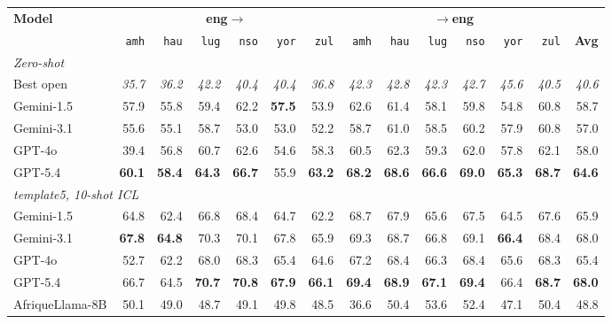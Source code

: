 \begin{table}[t]
\centering
\small
\renewcommand{\arraystretch}{1.05}
\begin{tabular}{lrrrrrrrrrrrrr}
\toprule
\textbf{Model} & \multicolumn{6}{c}{\textbf{eng$\to$}} & \multicolumn{6}{c}{\textbf{$\to$eng}} & \\
\cmidrule(lr){2-7}\cmidrule(lr){8-13}
   & \texttt{amh} & \texttt{hau} & \texttt{lug} & \texttt{nso} & \texttt{yor} & \texttt{zul} & \texttt{amh} & \texttt{hau} & \texttt{lug} & \texttt{nso} & \texttt{yor} & \texttt{zul} & \textbf{Avg} \\
\midrule
\multicolumn{14}{l}{\textit{Zero-shot}} \\
\midrule
Best open & \emph{35.7} & \emph{36.2} & \emph{42.2} & \emph{40.4} & \emph{40.4} & \emph{36.8} & \emph{42.3} & \emph{42.8} & \emph{42.3} & \emph{42.7} & \emph{45.6} & \emph{40.5} & \emph{40.6} \\
\midrule
Gemini-1.5 & 57.9 & 55.8 & 59.4 & 62.2 & \textbf{57.5} & 53.9 & 62.6 & 61.4 & 58.1 & 59.8 & 54.8 & 60.8 & 58.7 \\
Gemini-3.1 & 55.6 & 55.1 & 58.7 & 53.0 & 53.0 & 52.2 & 58.7 & 61.0 & 58.5 & 60.2 & 57.9 & 60.8 & 57.0 \\
GPT-4o & 39.4 & 56.8 & 60.7 & 62.6 & 54.6 & 58.3 & 60.5 & 62.3 & 59.3 & 62.0 & 57.8 & 62.1 & 58.0 \\
GPT-5.4 & \textbf{60.1} & \textbf{58.4} & \textbf{64.3} & \textbf{66.7} & 55.9 & \textbf{63.2} & \textbf{68.2} & \textbf{68.6} & \textbf{66.6} & \textbf{69.0} & \textbf{65.3} & \textbf{68.7} & \textbf{64.6} \\
\midrule\midrule
\multicolumn{14}{l}{\textit{template5, 10-shot ICL}} \\
\midrule
Gemini-1.5 & 64.8 & 62.4 & 66.8 & 68.4 & 64.7 & 62.2 & 68.7 & 67.9 & 65.6 & 67.5 & 64.5 & 67.6 & 65.9 \\
Gemini-3.1 & \textbf{67.8} & \textbf{64.8} & 70.3 & 70.1 & 67.8 & 65.9 & 69.3 & 68.7 & 66.8 & 69.1 & \textbf{66.4} & 68.4 & 68.0 \\
GPT-4o & 52.7 & 62.2 & 68.0 & 68.3 & 65.4 & 64.6 & 67.2 & 68.4 & 66.3 & 68.4 & 65.6 & 68.3 & 65.4 \\
GPT-5.4 & 66.7 & 64.5 & \textbf{70.7} & \textbf{70.8} & \textbf{67.9} & \textbf{66.1} & \textbf{69.4} & \textbf{68.9} & \textbf{67.1} & \textbf{69.4} & 66.4 & \textbf{68.7} & \textbf{68.0} \\
\midrule
AfriqueLlama-8B & 50.1 & 49.0 & 48.7 & 49.1 & 49.8 & 48.5 & 36.6 & 50.4 & 53.6 & 52.4 & 47.1 & 50.4 & 48.8 \\

\end{tabular}
\end{table}
